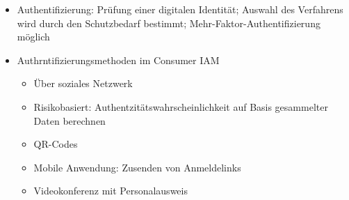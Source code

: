 \begin{itemize}
\begin{itemize}
		\item Authentifizierung: Prüfung einer digitalen Identität; Auswahl des Verfahrens wird durch den Schutzbedarf bestimmt; Mehr-Faktor-Authentifizierung möglich
		\item Authrntifizierungsmethoden im Consumer IAM
		\begin{itemize}
			\item Über soziales Netzwerk
			\item Risikobasiert: Authentzitätswahrscheinlichkeit auf Basis gesammelter Daten berechnen
			\item QR-Codes
			\item Mobile Anwendung: Zusenden von Anmeldelinks
			\item Videokonferenz mit Personalausweis
		\end{itemize}
	\end{itemize}
\end{itemize}
